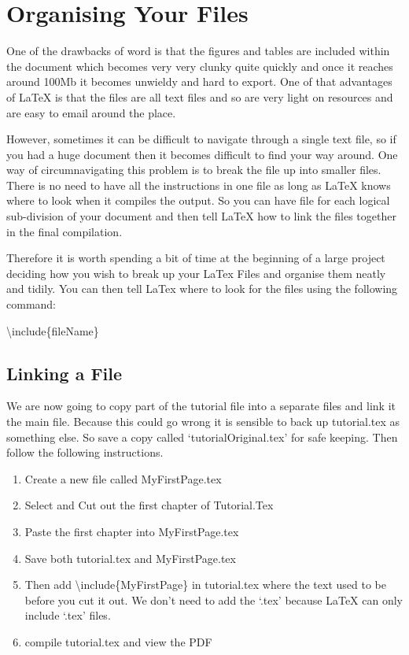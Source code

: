 \chapter{Organising Your Files}
One of the drawbacks of word is that the figures and tables are included within the document which becomes very very clunky quite quickly and once it reaches around 100Mb it becomes unwieldy and hard to export. One of that advantages of LaTeX is that the files are all text files and so are very light on resources and are easy to email around the place.

However, sometimes it can be difficult to navigate through a single text file, so if you had a huge document then it becomes difficult to find your way around.  One way of circumnavigating this problem is to break the file up into smaller files. There is no need to have all the instructions in one file as long as LaTeX knows where to look when it compiles the output. So you can have file for each logical sub-division of your document and then tell LaTeX how to link the files together in the final compilation.

Therefore it is worth spending a bit of time at the beginning of a large project deciding how you wish to break up your LaTex Files and organise them neatly and tidily.  You can then tell LaTex where to look for the files using the following command:

\vspace*{2ex}
{\textbackslash}include\{fileName\}
\vspace*{2ex}

\pagebreak
\section{Linking a File}
We are now going to copy part of the tutorial file into a separate files and link it the main file.  Because this could go wrong it is sensible to back up tutorial.tex as something else. So save a copy called `tutorialOriginal.tex' for safe keeping. Then follow the following instructions.

\begin{enumerate}
\item Create a new file called MyFirstPage.tex
\item Select and Cut out the first chapter of Tutorial.Tex
\item Paste the first chapter into MyFirstPage.tex
\item Save both tutorial.tex and MyFirstPage.tex
\item Then add {\textbackslash}include\{MyFirstPage\} in tutorial.tex where the text used to be before you cut it out. We don't need to add the `.tex' because LaTeX can only include `.tex' files.
\item compile tutorial.tex and view the PDF
\end{enumerate}

